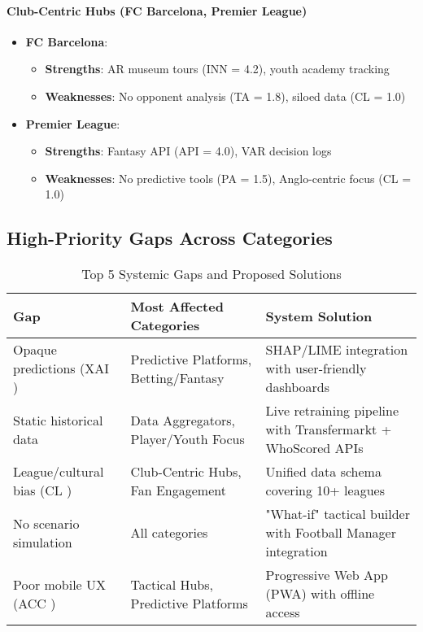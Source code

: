 \paragraph{Club-Centric Hubs (FC Barcelona, Premier League)}
\begin{itemize}
    \item \textbf{FC Barcelona}: 
    \begin{itemize}
        \item \textbf{Strengths}: AR museum tours (INN = 4.2), youth academy tracking
        \item \textbf{Weaknesses}: No opponent analysis (TA = 1.8), siloed data (CL = 1.0)
    \end{itemize}
    
    \item \textbf{Premier League}: 
    \begin{itemize}
        \item \textbf{Strengths}: Fantasy API (API = 4.0), VAR decision logs
        \item \textbf{Weaknesses}: No predictive tools (PA = 1.5), Anglo-centric focus (CL = 1.0)
    \end{itemize}
\end{itemize}

\subsection{High-Priority Gaps Across Categories}
\begin{table}[h!]
    \centering
    \caption{Top 5 Systemic Gaps and Proposed Solutions}
    \label{tab:top-gaps}
    \scriptsize
    \begin{tabularx}{\textwidth}{|l|l|X|}
        \hline
        \textbf{Gap} & \textbf{Most Affected Categories} & \textbf{System Solution} \\
        \hline
        Opaque predictions (XAI \leq 1.5) & Predictive Platforms, Betting/Fantasy & SHAP/LIME integration with user-friendly dashboards \\
        \hline
        Static historical data & Data Aggregators, Player/Youth Focus & Live retraining pipeline with Transfermarkt + WhoScored APIs \\
        \hline
        League/cultural bias (CL \leq 2.5) & Club-Centric Hubs, Fan Engagement & Unified data schema covering 10+ leagues \\
        \hline
        No scenario simulation & All categories & "What-if" tactical builder with Football Manager integration \\
        \hline
        Poor mobile UX (ACC \leq 3.0) & Tactical Hubs, Predictive Platforms & Progressive Web App (PWA) with offline access \\
        \hline
    \end{tabularx}
\end{table}

